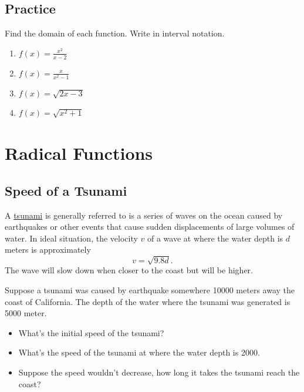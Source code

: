 \documentclass[
  en,11pt]{elegantbook}
\newcommand{\size}[2]{{\fontsize{#1}{0}\selectfont#2}}
\newenvironment{rmdthink}{
	\vspace*{0.5\baselineskip}
	\par\noindent
	\makebox[-4pt][r]{\color{green!90}\size{12}{\faLightbulbO}\,\,}
    \begin{tcolorbox}[
    enhanced,
    title={\textbf{\color{second}Think}},
    title style={left color=blue!10!green!20!white,right color=yellow!20!blue!20!white},
    colback=green!20!white,
    ]
    \sffamily
}{
    \end{tcolorbox}
	\par\ignorespacesafterend
}
\let\BeginKnitrBlock\begin \let\EndKnitrBlock\end
\begin{document}
\newpage

\hypertarget{practice-13}{%
\section{Practice}\label{practice-13}}

\BeginKnitrBlock{exercise}
\protect\hypertarget{exr:unnamed-chunk-277}{}{\label{exr:unnamed-chunk-277} }
Find the domain of each function. Write in interval notation.

\begin{enumerate}
\def\labelenumi{\arabic{enumi}.}

\item
  \(f(x)=\frac{x^2}{x-2}\)
\item
  \(f(x)=\frac{x}{x^2-1}\)
\item
  \(f(x)=\sqrt{2x-3}\)
\item
  \(f(x)=\sqrt{x^2+1}\)\hfill\null
\end{enumerate}
\EndKnitrBlock{exercise}

\hypertarget{radical-functions}{%
\chapter{Radical Functions}\label{radical-functions}}

\hypertarget{speed-of-a-tsunami}{%
\section{Speed of a Tsunami}\label{speed-of-a-tsunami}}

\begin{rmdthink}

A \href{https://en.wikipedia.org/wiki/Tsunami}{tsunami} is generally referred to is a series of waves on the ocean caused by earthquakes or other events that cause sudden displacements of large volumes of water. In ideal situation, the velocity \(v\) of a wave at where the water depth is \(d\) meters is approximately
\[
v=\sqrt{9.8d}.
\]
The wave will slow down when closer to the coast but will be higher.

Suppose a tsunami was caused by earthquake somewhere 10000 meters away the coast of California. The depth of the water where the tsunami was generated is 5000 meter.

\begin{itemize}

\item
  What's the initial speed of the tsunami?
\item
  What's the speed of the tsunami at where the water depth is 2000.
\item
  Suppose the speed wouldn't decrease, how long it takes the tsunami reach the coast?
\end{itemize}

\end{rmdthink}
\end{document}
